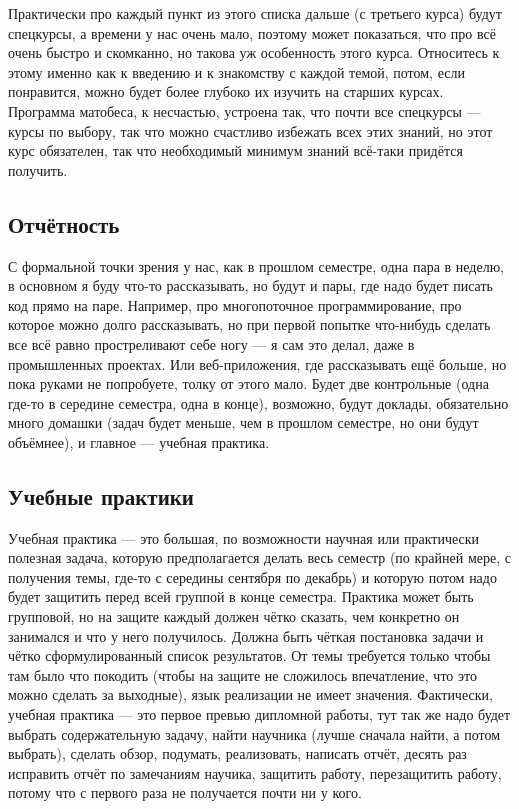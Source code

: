\documentclass[a5paper]{article}
\begin{document}
Практически про каждый пункт из этого списка дальше (с третьего курса) будут спецкурсы, а времени у нас очень мало, поэтому может показаться, что про всё очень быстро и скомканно, но такова уж особенность этого курса. Относитесь к этому именно как к введению и к знакомству с каждой темой, потом, если понравится, можно будет более глубоко их изучить на старших курсах. Программа матобеса, к несчастью, устроена так, что почти все спецкурсы --- курсы по выбору, так что можно счастливо избежать всех этих знаний, но этот курс обязателен, так что необходимый минимум знаний всё-таки придётся получить.

\subsection{Отчётность}

С формальной точки зрения у нас, как в прошлом семестре, одна пара в неделю, в основном я буду что-то рассказывать, но будут и пары, где надо будет писать код прямо на паре. Например, про многопоточное программирование, про которое можно долго рассказывать, но при первой попытке что-нибудь сделать все всё равно простреливают себе ногу --- я сам это делал, даже в промышленных проектах. Или веб-приложения, где рассказывать ещё больше, но пока руками не попробуете, толку от этого мало. Будет две контрольные (одна где-то в середине семестра, одна в конце), возможно, будут доклады, обязательно много домашки (задач будет меньше, чем в прошлом семестре, но они будут объёмнее), и главное --- учебная практика.

\subsection{Учебные практики}

Учебная практика --- это большая, по возможности научная или практически полезная задача, которую предполагается делать весь семестр (по крайней мере, с получения темы, где-то с середины сентября по декабрь) и которую потом надо будет защитить перед всей группой в конце семестра. Практика может быть групповой, но на защите каждый должен чётко сказать, чем конкретно он занимался и что у него получилось. Должна быть чёткая постановка задачи и чётко сформулированный список результатов. От темы требуется только чтобы там было что покодить (чтобы на защите не сложилось впечатление, что это можно сделать за выходные), язык реализации не имеет значения. Фактически, учебная практика --- это первое превью дипломной работы, тут так же надо будет выбрать содержательную задачу, найти научника (лучше сначала найти, а потом выбрать), сделать обзор, подумать, реализовать, написать отчёт, десять раз исправить отчёт по замечаниям научика, защитить работу, перезащитить работу, потому что с первого раза не получается почти ни у кого.
\end{document}
